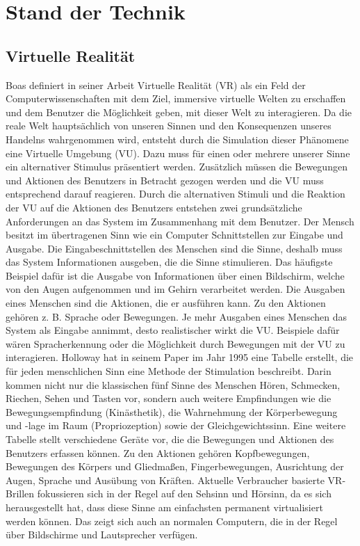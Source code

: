 \chapter{Stand der Technik}

\section{Virtuelle Realität}
Boas definiert in  seiner Arbeit \cite{Boas2012} Virtuelle Realität (VR) als ein Feld der Computerwissenschaften mit dem Ziel, immersive virtuelle Welten zu erschaffen und dem Benutzer die Möglichkeit geben, mit dieser Welt zu interagieren. 
Da die reale Welt hauptsächlich von unseren Sinnen und den Konsequenzen unseres Handelns wahrgenommen wird, entsteht durch die Simulation dieser Phänomene eine Virtuelle Umgebung (VU). Dazu muss für einen oder mehrere unserer Sinne ein alternativer Stimulus präsentiert werden. Zusätzlich müssen die Bewegungen und Aktionen des Benutzers in Betracht gezogen werden und die VU muss entsprechend darauf reagieren.
Durch die alternativen Stimuli und die Reaktion der VU auf die Aktionen des Benutzers entstehen zwei grundsätzliche Anforderungen an das System im Zusammenhang mit dem Benutzer. Der Mensch besitzt im übertragenen Sinn wie ein Computer Schnittstellen zur Eingabe und Ausgabe. Die Eingabeschnittstellen des Menschen sind die Sinne, deshalb muss das System Informationen ausgeben, die die Sinne stimulieren. Das häufigste Beispiel dafür ist die Ausgabe von Informationen über einen Bildschirm, welche von den Augen aufgenommen und im Gehirn verarbeitet werden. Die Ausgaben eines Menschen sind die Aktionen, die er ausführen kann. Zu den Aktionen gehören z. B. Sprache oder Bewegungen. Je mehr Ausgaben eines Menschen das System als Eingabe annimmt, desto realistischer wirkt die VU. Beispiele dafür wären Spracherkennung oder die Möglichkeit durch Bewegungen mit der VU zu interagieren.
Holloway\cite{Holloway1995} hat in seinem Paper im Jahr 1995 eine Tabelle erstellt, die für jeden menschlichen Sinn eine Methode der Stimulation beschreibt. Darin kommen nicht nur die klassischen fünf Sinne des Menschen Hören, Schmecken, Riechen, Sehen und Tasten vor, sondern auch weitere Empfindungen wie die Bewegungsempfindung (Kinästhetik), die Wahrnehmung der Körperbewegung und -lage im Raum (Propriozeption) sowie der Gleichgewichtssinn.
Eine weitere Tabelle stellt verschiedene Geräte vor, die die Bewegungen und Aktionen des Benutzers erfassen können. Zu den Aktionen gehören Kopfbewegungen, Bewegungen des Körpers und Gliedmaßen, Fingerbewegungen, Ausrichtung der Augen, Sprache und Ausübung von Kräften.
Aktuelle Verbraucher basierte VR-Brillen fokussieren sich in der Regel auf den Sehsinn und Hörsinn, da es sich herausgestellt hat, dass diese Sinne am einfachsten permanent virtualisiert werden können. Das zeigt sich auch an normalen Computern, die in der Regel über Bildschirme und Lautsprecher verfügen.\cite{Holloway1995}

